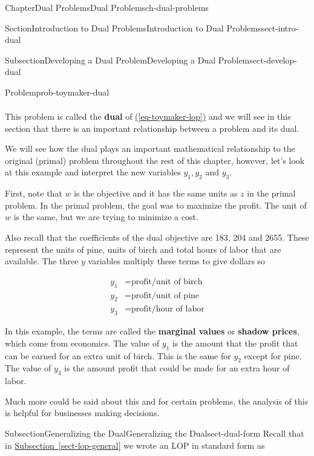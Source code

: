 \documentclass[oneside,10pt,]{book}
\newcommand{\xreffont}{\relax}
\newcommand{\terminology}[1]{\textbf{#1}}
\numberwithin{equation}{section}
\newcommand{\amp}{&}
\begin{document}
\begin{chapterptx}{Chapter}{Dual Problems}{}{Dual Problems}{}{}{ch-dual-problems}
\begin{sectionptx}{Section}{Introduction to Dual Problems}{}{Introduction to Dual Problems}{}{}{sect-intro-dual}
\begin{subsectionptx}{Subsection}{Developing a Dual Problem}{}{Developing a Dual Problem}{}{}{sect-develop-dual}
\begin{problem}{Problem}{}{prob-toymaker-dual}
\begin{equation*}
\begin{aligned}
\end{aligned}
\end{equation*}
%
\end{problem}
This problem is called the \terminology{dual} of \hyperref[eq-toymaker-lop]{({\xreffont\ref{eq-toymaker-lop}})} and we will see in this section that there is an important relationship between a problem and its dual.%
\par
We will see how the dual plays an important mathematical relationship to the original (primal) problem throughout the rest of this chapter, however, let's look at this example and interpret the new variables \(y_1, y_2\) and \(y_3\).%
\par
First, note that \(w\) is the objective and it has the same units as \(z\) in the primal problem.  In the primal problem, the goal was to maximize the profit.  The unit of \(w\) is the same, but we are trying to minimize a cost.%
\par
Also recall that the coefficients of the dual objective are 183, 204 and 2655.  These represent the units of pine, units of birch and total hours of labor that are available.  The three \(y\) variables multiply these terms to give dollars so%
\par
%
\begin{align*}
y_1 \amp = \text{profit/unit of birch} \\
y_2 \amp = \text{profit/unit of pine} \\
y_3 \amp = \text{profit/hour of labor}
\end{align*}
%
\par
In this example, the terms are called the \terminology{marginal values} or \terminology{shadow prices}, which come from economics.  The value of \(y_1\) is the amount that the profit that can be earned for an extra unit of birch.  This is the same for \(y_2\) except for pine.  The value of \(y_3\) is the amount profit that could be made for an extra hour of labor.%
\par
Much more could be said about this and for certain problems, the analysis of this is helpful for businesses making decisions.%
\end{subsectionptx}
%
%
\typeout{************************************************}
\typeout{************************************************}
%
\begin{subsectionptx}{Subsection}{Generalizing the Dual}{}{Generalizing the Dual}{}{}{sect-dual-form}
Recall that in \hyperref[sect-lop-general]{Subsection~{\xreffont\ref{sect-lop-general}}} we wrote an LOP in standard form as%

\end{subsectionptx}
\end{sectionptx}
\end{chapterptx}
\end{document}
